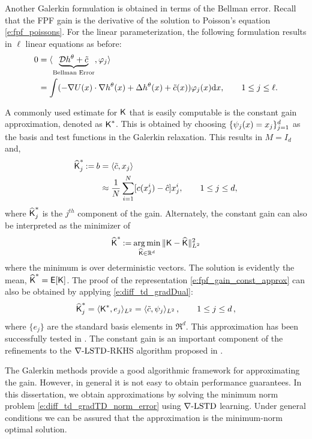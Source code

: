 Another Galerkin formulation is obtained in terms of the Bellman error. Recall that the FPF gain is the derivative of the solution to Poisson's equation \eqref{e:fpf_poissons}. For the linear parameterization, the following formulation results in $\ell$ linear equations as before:
\begin{equation}
\begin{aligned}
0 &= \langle \underbrace{\clD h^\param+\tilc}_{\text{Bellman Error}}, \test_{j} \rangle \\
&= \int (-\nabla U(x) \cdot \nabla h^\param(x)+ \Delta h^\param(x)+\tilc (x))\test_{j}(x) \ud x,  \qquad  1\leq j \leq \ell.
\end{aligned}
\label{e:fpf_galerkin_be}
\end{equation}

A commonly used estimate for $\text{\sf K}$ that is easily computable is the constant gain approximation, denoted as $\text{\sf K}^*$. This is obtained by choosing $\{\psi_j(x) = x_j\}_{j=1}^d$ as the basis and test functions in the Galerkin relaxation. This results in  $M = I_{d}$ and,
\begin{align}
\hakFPF^*_j \eqdef b & = \langle \tilc , x_j \rangle \\ 
& \approx \frac{1}{N} \sum_{i=1}^N [ c(x^i_j) - \hac ]x^i_j, \qquad 1 \leq j \leq d,
\label{e:fpf_gain_const_approx}
\end{align}
where $\widehat{\text{\sf K}}^*_j$ is the $j^{th}$ component of the gain.
Alternately, the constant gain can also be interpreted as the minimizer of 
  \begin{equation}
  \hakFPF^* \eqdef \argmin_{\hakFPF \in \Re^d} \| \kFPF - \hakFPF \|^2_{L^{2}}
  \label{e:fpf_const}
  \end{equation}
  where the minimum is over deterministic vectors. The solution is evidently the mean,  $\widehat{\text{\sf K}}^* = {\sf E}[\text{\sf K}]$.
The proof of the representation \eqref{e:fpf_gain_const_approx} can also be obtained by applying \eqref{e:diff_td_gradDual}: 
\[
\widehat{\text{\sf K}}^*_ j =  \langle \text{\sf K}^* ,e_j \rangle_{L^2}
=
\langle \tilde c ,\psi_j \rangle_{L^2}\,, \qquad 1\le j\le d\,,
\]
where $\{e_j\}$ are the standard basis elements in $\Re^d$. This approximation has been successfully tested in \cite{tilghiomeh13}. The constant gain is an important component of the refinements to the $\nabla\text{-LSTD}$-RKHS algorithm proposed in .

The Galerkin methods provide a good algorithmic framework for approximating the gain. However, in general it is not easy to obtain performance guarantees. In this dissertation, we obtain approximations by solving  the minimum norm problem \eqref{e:diff_td_gradTD_norm_error} using $\nabla\text{-LSTD}$ learning.  Under general conditions we can be assured that the approximation is the minimum-norm optimal solution.   

